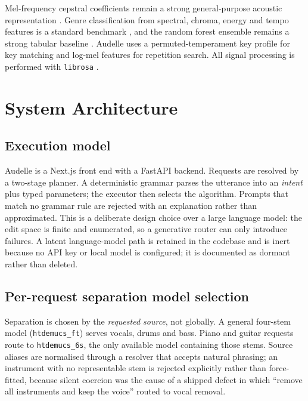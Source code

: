 \documentclass[conference]{IEEEtran}
\begin{document}
Mel-frequency cepstral coefficients remain a strong general-purpose acoustic
representation \cite{davis1990comparison}. Genre classification from spectral, chroma, energy and
tempo features is a standard benchmark \cite{tzanetakis2002genre}, and the random forest ensemble
remains a strong tabular baseline \cite{breiman2001random}. Audelle uses a permuted-temperament
key profile for key matching \cite{krumhansl1982perceived} and log-mel features for repetition search.
All signal processing is performed with \texttt{librosa} \cite{mcfee2015librosa}.

\section{System Architecture}

\subsection{Execution model}

Audelle is a Next.js front end with a FastAPI backend. Requests are resolved by
a two-stage planner. A deterministic grammar parses the utterance into an
\textit{intent} plus typed parameters; the executor then selects the algorithm.
Prompts that match no grammar rule are rejected with an explanation rather than
approximated. This is a deliberate design choice over a large language model: the
edit space is finite and enumerated, so a generative router can only introduce
failures. A latent language-model path is retained in the codebase and is inert
because no API key or local model is configured; it is documented as dormant
rather than deleted.

\subsection{Per-request separation model selection}

Separation is chosen by the \emph{requested source}, not globally. A general
four-stem model (\texttt{htdemucs\_ft}) serves vocals, drums and bass.
Piano and guitar requests route to \texttt{htdemucs\_6s}, the only available
model containing those stems. Source aliases are normalised through a resolver
that accepts natural phrasing; an instrument with no representable stem is
rejected explicitly rather than force-fitted, because silent coercion was the
cause of a shipped defect in which ``remove all instruments and keep the voice''
routed to vocal removal.
\end{document}
